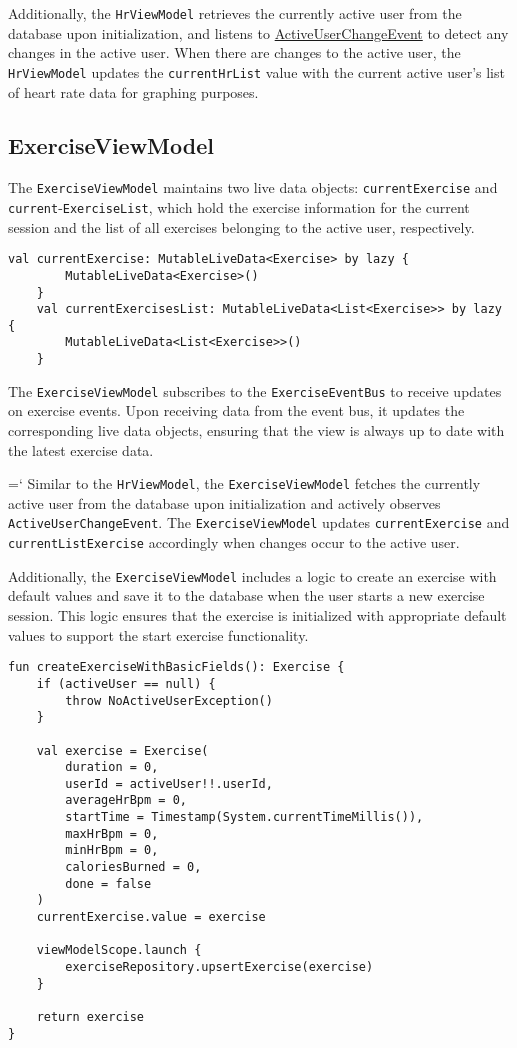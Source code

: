 Additionally, the \verb;HrViewModel; retrieves the currently active user from the database upon initialization, and listens to \url{ActiveUserChangeEvent} to detect any changes in the active user.
When there are changes to the active user, the \verb;HrViewModel; updates the \verb;currentHrList; value with the current active user's list of heart rate data for graphing purposes.

\subsection{ExerciseViewModel}
\label{chap:exerciseviewmodel_impl}
The \verb;ExerciseViewModel; maintains two live data objects: \verb;currentExercise; and \verb;current;-\verb;ExerciseList;, which hold the exercise information for the current session and the list of all exercises belonging to the active user, respectively. 
\begin{lstlisting}[caption={LiveData implementation (ExerciseViewModel)}]
    val currentExercise: MutableLiveData<Exercise> by lazy {
        MutableLiveData<Exercise>()
    }
    val currentExercisesList: MutableLiveData<List<Exercise>> by lazy {
        MutableLiveData<List<Exercise>>()
    }
\end{lstlisting}
The \verb;ExerciseViewModel; subscribes to the \verb;ExerciseEventBus; to receive updates on exercise events. Upon receiving data from the event bus, it updates the corresponding live data objects, ensuring that the view is always up to date with the latest exercise data.

{{\ttfamily \hyphenchar\the\font=`\-}
Similar to the \verb;HrViewModel;, the \verb;ExerciseViewModel; fetches the currently active user from the database upon initialization and actively observes \texttt{ActiveUserChangeEvent}.
The \verb;ExerciseViewModel; updates \verb;currentExercise; and \texttt{currentListExercise} accordingly when changes occur to the active user.
\par}

Additionally, the \verb;ExerciseViewModel; includes a logic to create an exercise with default values and save it to the database when the user starts a new exercise session. This logic ensures that the exercise is initialized with appropriate default values to support the start exercise functionality.
\begin{lstlisting}[caption={Create default exercise function (ExerciseViewModel)}]
fun createExerciseWithBasicFields(): Exercise {
    if (activeUser == null) {
        throw NoActiveUserException()
    }

    val exercise = Exercise(
        duration = 0,
        userId = activeUser!!.userId,
        averageHrBpm = 0,
        startTime = Timestamp(System.currentTimeMillis()),
        maxHrBpm = 0,
        minHrBpm = 0,
        caloriesBurned = 0,
        done = false
    )
    currentExercise.value = exercise

    viewModelScope.launch {
        exerciseRepository.upsertExercise(exercise)
    }

    return exercise
}
\end{lstlisting}

